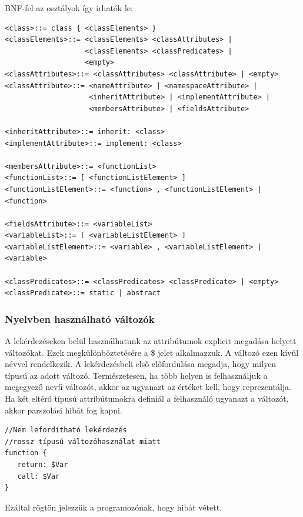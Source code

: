 \documentclass[a4paper,12pt]{report}
\begin{document}
BNF-fel az osztályok így írhatók le:
\begin{verbatim}
<class>::= class { <classElements> }
<classElements>::= <classElements> <classAttributes> | 
                   <classElements> <classPredicates> | 
                   <empty>
<classAttributes>::= <classAttributes> <classAttribute> | <empty>
<classAttribute>::= <nameAttribute> | <namespaceAttribute> | 
                    <inheritAttribute> | <implementAttribute> | 
                    <membersAttribute> | <fieldsAttribute>
                    
<inheritAttribute>::= inherit: <class>
<implementAttribute>::= implement: <class>

<membersAttribute>::= <functionList>
<functionList>::= [ <functionListElement> ]
<functionListElement>::= <function> , <functionListElement> | <function>

<fieldsAttribute>::= <variableList>
<variableList>::= [ <variableListElement> ]
<variableListElement>::= <variable> , <variableListElement> | <variable>

<classPredicates>::= <classPredicates> <classPredicate> | <empty>
<classPredicate>::= static | abstract
\end{verbatim}
\subsubsection{Nyelvben használható változók}
A lekérdezéseken belül használhatunk az attribútumok explicit megadása helyett változókat. Ezek megkülönböztetésére a \$ jelet alkalmazzuk. A változó ezen kívül névvel rendelkezik. A lekérdezésbeli első előfordulása megadja, hogy milyen típusú az adott változó. Természetesen, ha több helyen is felhasználjuk a megegyező nevű változót, akkor az ugyanazt az értéket kell, hogy reprezentálja. Ha két eltérő típusú attribútumokra definiál a felhasználó ugyanazt a változót, akkor parszolási hibát fog kapni.
\begin{verbatim}
//Nem lefordítható lekérdezés
//rossz típusú változóhasználat miatt
function {
   return: $Var
   call: $Var
}
\end{verbatim}
Ezáltal rögtön jelezzük a programozónak, hogy hibát vétett.
\end{document}

